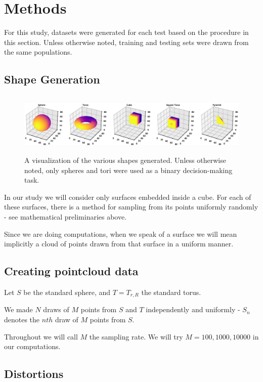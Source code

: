 \documentclass{article}
\begin{document}
\section{Methods}
For this study, datasets were generated for each test based on the procedure in this section. Unless otherwise noted, training and testing sets were drawn from the same populations.

\subsection{Shape Generation}

\begin{figure}%
\vskip 0.2in
\begin{center}
\centerline{\includegraphics[height=3cm]{graphics/shape_library}}
\caption{A visualization of the various shapes generated. Unless otherwise noted, only spheres and tori were used as a binary decision-making task.}
\label{shape_library}
\end{center}
\vskip -0.2in
\end{figure}

In our study we will consider only surfaces embedded inside a cube.
For each of these surfaces, there is a method for sampling from its points uniformly randomly - see mathematical preliminaries above.

Since we are doing computations, when we speak of a surface we will mean
implicitly a cloud of points drawn from that surface in a uniform manner.

\subsection{Creating pointcloud data}

Let $S$ be the standard sphere, and $T = T_{r,R}$ the standard torus.

We made $N$ draws of $M$ points from $S$ and $T$ independently and
uniformly - $S_n$ denotes the $nth$ draw of $M$ points from $S$.

Throughout we will call $M$ the sampling rate. We will try $M = 100, 1000,10000$ in our computations.

\subsection{Distortions}
\end{document}
